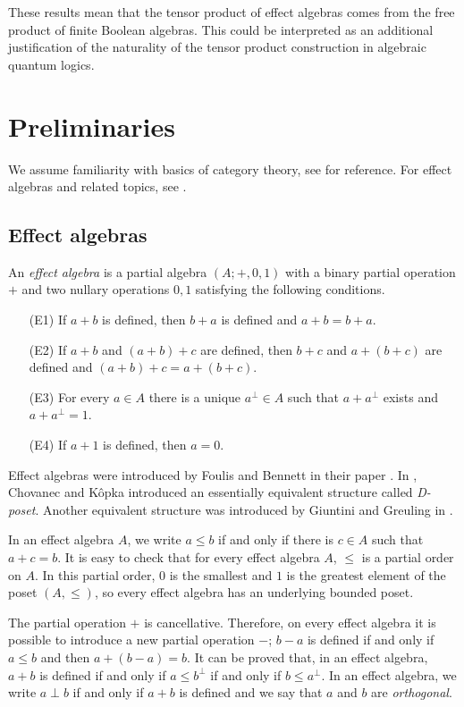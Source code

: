 \documentclass[smallextended]{svjour3}
\begin{document}
These results mean that the tensor product of effect algebras comes from 
the free product of finite Boolean algebras.  This could be interpreted as an additional
justification of the naturality of the tensor product construction in algebraic
quantum logics.

\section{Preliminaries}

We assume familiarity with basics of category theory, see
\cite{mac1998categories,riehl2016category} for reference.
For effect algebras and related topics, see \cite{DvuPul:NTiQS}. 

\subsection{Effect algebras}

An {\em effect algebra} 
is a partial algebra $(A;+,0,1)$ with a binary 
partial operation $+$ and two nullary operations $0,1$ satisfying
the following conditions.
\begin{enumerate}
\item[(E1)]If $a+b$ is defined, then $b+a$ is defined and
		$a+b=b+a$.
\item[(E2)]If $a+b$ and $(a+b)+c$ are defined, then
		$b+c$ and $a+(b+c)$ are defined and
		$(a+b)+c=a+(b+c)$.
\item[(E3)]For every $a\in A$ there is a unique $a^\perp\in A$ such that
		$a+a^\perp$ exists and $a+a^\perp=1$.
\item[(E4)]If $a+1$ is defined, then $a=0$.
\end{enumerate}

Effect algebras were introduced by Foulis and Bennett in their paper 
\cite{FouBen:EAaUQL}.
In \cite{KopCho:DP}, Chovanec and K\^ opka introduced
an essentially equivalent structure called {\em D-poset}.
Another equivalent structure was introduced by Giuntini and
Greuling in \cite{GiuGre:TaFLfUP}. 

In an effect algebra $A$, we write $a\leq b$ if and only if there is
$c\in A$ such that $a+ c=b$.  It is easy to check that for every effect
algebra $A$, $\leq$ is a partial order on $A$.  In this partial order,
$0$ is the smallest and $1$ is the greatest element of the poset $(A,\leq)$,
so every effect algebra has an underlying bounded poset.

The partial operation $+$ is cancellative. Therefore, on every effect algebra it is possible to introduce
a new partial operation $-$; $b-a$ is defined if and only if $a\leq
b$ and then $a+(b-a)=b$.  It can be proved that, in an effect
algebra, $a+ b$ is defined if and only if $a\leq b^\perp$ if and only if $b\leq
a^\perp$. In an effect algebra, we write $a\perp b$ if and only if $a+b$ 
is defined and we say that $a$ and $b$ are {\em orthogonal}.
\end{document}

